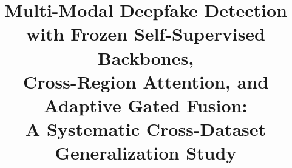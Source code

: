 \documentclass[conference]{IEEEtran}
\begin{document}
\title{Multi-Modal Deepfake Detection with Frozen Self-Supervised Backbones,\\
Cross-Region Attention, and Adaptive Gated Fusion:\\
A Systematic Cross-Dataset Generalization Study}

\author{
}

\maketitle
\end{document}

